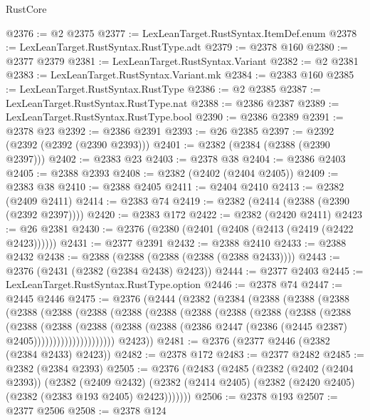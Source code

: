 \begin{lexlean}{RustCore}
\begin{coremodule}
@2376 := @2 @2375
@2377 := LexLeanTarget.RustSyntax.ItemDef.enum
@2378 := LexLeanTarget.RustSyntax.RustType.adt
@2379 := @2378 @160
@2380 := @2377 @2379
@2381 := LexLeanTarget.RustSyntax.Variant
@2382 := @2 @2381
@2383 := LexLeanTarget.RustSyntax.Variant.mk
@2384 := @2383 @160
@2385 := LexLeanTarget.RustSyntax.RustType
@2386 := @2 @2385
@2387 := LexLeanTarget.RustSyntax.RustType.nat
@2388 := @2386 @2387
@2389 := LexLeanTarget.RustSyntax.RustType.bool
@2390 := @2386 @2389
@2391 := @2378 @23
@2392 := @2386 @2391
@2393 := @26 @2385
@2397 := @2392 (@2392 (@2392 (@2390 @2393)))
@2401 := @2382 (@2384 (@2388 (@2390 @2397)))
@2402 := @2383 @23
@2403 := @2378 @38
@2404 := @2386 @2403
@2405 := @2388 @2393
@2408 := @2382 (@2402 (@2404 @2405))
@2409 := @2383 @38
@2410 := @2388 @2405
@2411 := @2404 @2410
@2413 := @2382 (@2409 @2411)
@2414 := @2383 @74
@2419 := @2382 (@2414 (@2388 (@2390 (@2392 @2397))))
@2420 := @2383 @172
@2422 := @2382 (@2420 @2411)
@2423 := @26 @2381
@2430 := @2376 (@2380 (@2401 (@2408 (@2413 (@2419 (@2422 @2423))))))
@2431 := @2377 @2391
@2432 := @2388 @2410
@2433 := @2388 @2432
@2438 := @2388 (@2388 (@2388 (@2388 (@2388 @2433))))
@2443 := @2376 (@2431 (@2382 (@2384 @2438) @2423))
@2444 := @2377 @2403
@2445 := LexLeanTarget.RustSyntax.RustType.option
@2446 := @2378 @74
@2447 := @2445 @2446
@2475 := @2376
    (@2444
      (@2382
        (@2384
          (@2388
            (@2388
              (@2388
                (@2388
                  (@2388
                    (@2388
                      (@2388
                        (@2388
                          (@2388
                            (@2388
                              (@2388
                                (@2388
                                  (@2388
                                    (@2388
                                      (@2388
                                        (@2388
                                          (@2388
                                            (@2388
                                              (@2386
                                                @2447
                                                (@2386 (@2445 @2387) @2405)))))))))))))))))))))
        @2423))
@2481 := @2376 (@2377 @2446 (@2382 (@2384 @2433) @2423))
@2482 := @2378 @172
@2483 := @2377 @2482
@2485 := @2382 (@2384 @2393)
@2505 := @2376
    (@2483
      (@2485
        (@2382
          (@2402 (@2404 @2393))
          (@2382
            (@2409 @2432)
            (@2382 (@2414 @2405) (@2382 (@2420 @2405) (@2382 (@2383 @193 @2405) @2423)))))))
@2506 := @2378 @193
@2507 := @2377 @2506
@2508 := @2378 @124

\end{coremodule}
\end{lexlean}
